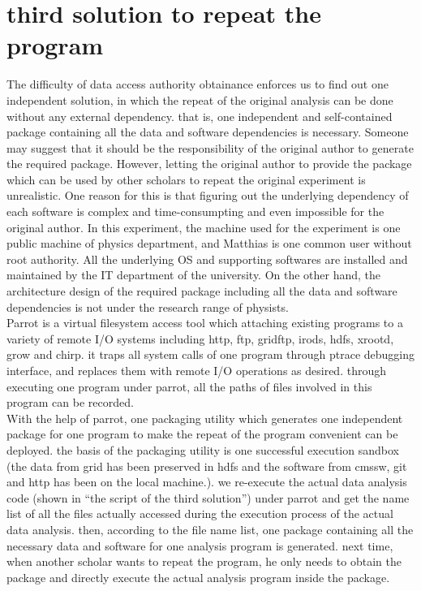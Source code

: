\documentclass{article}
\begin{document}
\section{third solution to repeat the program}
\indent The difficulty of data access authority obtainance enforces us to find out one independent solution, in which the repeat of the original analysis can be done without any external dependency. that is, one independent and self-contained package containing all the data and software dependencies is necessary. Someone may suggest that it should be the responsibility of the original author to generate the required package. However, letting the original author to provide the package which can be used by other scholars to repeat the original experiment is unrealistic. One reason for this is that figuring out the underlying dependency of each software is complex and time-consumpting and even impossible for the original author. In this experiment, the machine used for the experiment is one public machine of physics department, and Matthias is one common user without root authority. All the underlying OS and supporting softwares are installed and maintained by the IT department of the university. On the other hand, the architecture design of the required package including all the data and software dependencies is not under the research range of physists.\\ 

Parrot is a virtual filesystem access tool which attaching existing programs to a variety of remote I/O systems including http, ftp, gridftp, irods, hdfs, xrootd, grow and chirp. it traps all system calls of one program through ptrace debugging interface, and replaces them with remote I/O operations as desired. through executing one program under parrot, all the paths of files involved in this program can be recorded.\\

With the help of parrot, one packaging utility which generates one independent package for one program to make the repeat of the program convenient can be deployed. the basis of the packaging utility is one successful execution sandbox (the data from grid has been preserved in hdfs and the software from cmssw, git and http has been on the local machine.). we re-execute the actual data analysis code (shown in “the script of the third solution”) under parrot and get the name list of all the files actually accessed during the execution process of the actual data analysis. then, according to the file name list, one package containing all the necessary data and software for one analysis program is generated. next time, when another scholar wants to repeat the program, he only needs to obtain the package and directly execute the actual analysis program inside the package.\\
\end{document}
